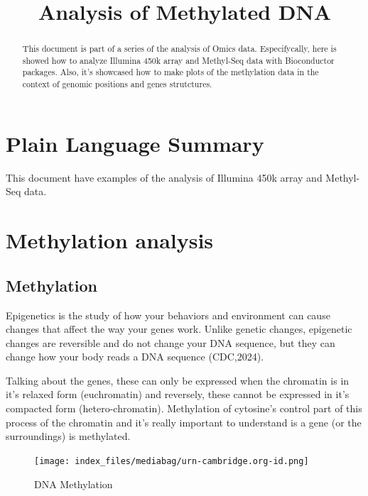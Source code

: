 \documentclass[
]{agujournal2019}
\begin{document}
\title{Analysis of Methylated DNA}




\begin{abstract}
This document is part of a series of the analysis of Omics data.
Especifycally, here is showed how to analyze Illumina 450k array and
Methyl-Seq data with Bioconductor packages. Also, it's showcased how to
make plots of the methylation data in the context of genomic positions
and genes strutctures.
\end{abstract}

\section*{Plain Language Summary}
This document have examples of the analysis of Illumina 450k array and
Methyl-Seq data.



\section{Methylation analysis}\label{methylation-analysis}

\subsection{Methylation}\label{methylation}

Epigenetics is the study of how your behaviors and environment can cause
changes that affect the way your genes work. Unlike genetic changes,
epigenetic changes are reversible and do not change your DNA sequence,
but they can change how your body reads a DNA sequence (CDC,2024).

Talking about the genes, these can only be expressed when the chromatin
is in it's relaxed form (euchromatin) and reversely, these cannot be
expressed in it's compacted form (hetero-chromatin). Methylation of
cytosine's control part of this process of the chromatin and it's really
important to understand is a gene (or the surroundings) is methylated.

\begin{figure}[H]

{\centering \texttt{[image: index\_files/mediabag/urn-cambridge.org-id.png]}

}

\caption{DNA Methylation}

\end{figure}%
\end{document}
